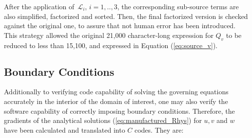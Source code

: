 \documentclass[10pt]{article}
\newcommand{\Lo}{\,\mathcal{L}}
\begin{document}
\begin{landscape}
After the application of $\Lo_i$, $i=1,..,3$, the corresponding sub-source terms are also simplified, factorized and sorted. Then, the final factorized version is checked against the original one, to assure that not human error has been introduced.  This strategy allowed the original  21,000 character-long  expression for $Q_{v}$ to be reduced to less than 15,100, and expressed in Equation (\ref{eq:source_v}).

\subsection{Boundary Conditions}
Additionally to verifying code capability of solving the governing equations accurately in the interior of the domain of interest, one may also verify the software capability of correctly imposing boundary conditions. Therefore, the gradients of the  analytical solutions (\ref{eq:manufactured_Rhys}) for $u,v$ and $w$ have been calculated and translated into $C$ codes. They are:


\end{landscape}
\end{document}
